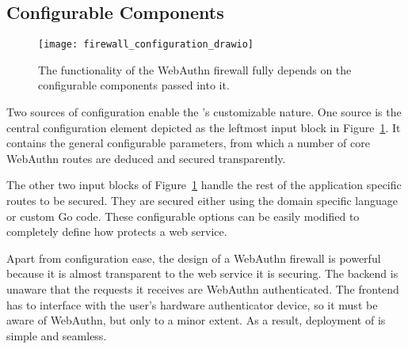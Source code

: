 \subsection{Configurable Components}

\begin{figure}[h]
  \centering
  \texttt{[image: firewall\_configuration\_drawio]}
  \caption{The functionality of the WebAuthn firewall fully depends on the configurable components passed into it.}
  \label{Fig:ConfigurableComponents}
\end{figure}

Two sources of configuration enable the \sys{}'s customizable nature. One source is the central configuration element depicted as the leftmost input block in Figure~\ref{Fig:ConfigurableComponents}. It contains the general configurable parameters, from which a number of core WebAuthn routes are deduced and secured transparently.

The other two input blocks of Figure~\ref{Fig:ConfigurableComponents} handle the rest of the application specific routes to be secured. They are secured either using the domain specific language or custom Go code. These configurable options can be easily modified to completely define how \sys{} protects a web service. 






Apart from configuration ease, the design of a WebAuthn firewall is powerful because it is almost transparent to the web service it is securing. The backend is unaware that the requests it receives are WebAuthn authenticated. The frontend has to interface with the user's hardware authenticator device, so it must be aware of WebAuthn, but only to a minor extent. As a result, deployment of \sys{} is simple and seamless.

